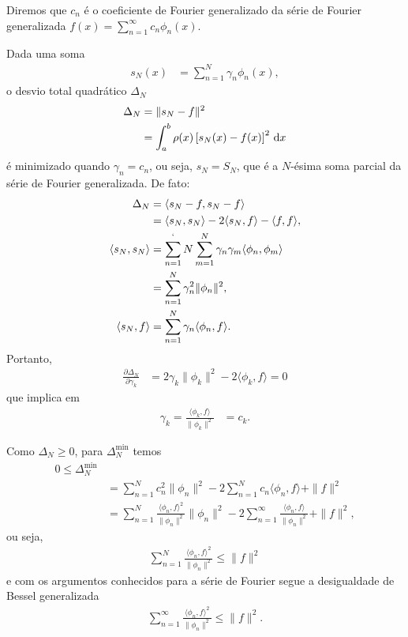 Diremos que $c_n$ é o coeficiente de Fourier generalizado da série de Fourier generalizada $f(x) = \sum_{n = 1}^\infty c_n \phi_n(x)$.

Dada uma soma
\begin{align*}
    s_N(x) &= \sum_{n = 1}^N \gamma_n \phi_n(x),
\end{align*}
o desvio total quadrático $\Delta_N$
\begin{align*}
    \Delta_N &= \| s_N - f \|^2 \\
    &= \int_a^b \rho(x) \left[ s_N(x) - f(x) \right]^2 \, \mathrm{d}x
\end{align*}
é minimizado quando $\gamma_n = c_n$, ou seja, $s_N = S_N$, que é a $N$-ésima soma parcial da série de Fourier generalizada. De fato:
\begin{align*}
    \Delta_N &= \langle s_N - f, s_N - f \rangle \\
    &= \langle s_N, s_N \rangle - 2 \langle s_N, f \rangle - \langle f, f \rangle, \\
    \langle s_N, s_N \rangle &= \sum_{n = 1}^`N \sum_{m = 1}^N \gamma_n \gamma_m \langle \phi_n, \phi_m \rangle \\
    &= \sum_{n = 1}^N \gamma_n^2 \| \phi_n \|^2, \\
    \langle s_N, f \rangle &= \sum_{n = 1}^N \gamma_n \langle \phi_n, f \rangle.
\end{align*}
Portanto,
\begin{align*}
    \frac{\partial \Delta_N}{\partial \gamma_k} &= 2 \gamma_k \| \phi_k \|^2 - 2 \langle \phi_k, f \rangle = 0
\end{align*}
que implica em
\begin{align*}
    \gamma_k = \frac{\langle \phi_k, f \rangle}{\| \phi_k \|^2} &= c_k.
\end{align*}

Como $\Delta_N \geq 0$, para $\Delta_N^{\min{}}$ temos
\begin{align*}
    0 \leq \Delta_N^{\min{}} \\
    &= \sum_{n = 1}^N c_n^2 \| \phi_n \|^2 - 2 \sum_{n = 1}^N c_n \langle \phi_n, f \rangle + \| f \|^2 \\
    &= \sum_{n = 1}^N \frac{\langle \phi_n, f \rangle^2}{\| \phi_n \|^2} \| \phi_n \|^2 - 2 \sum_{n = 1}^\infty \frac{\langle \phi_n, f \rangle}{\| \phi_n \|^2} + \| f \|^2,
\end{align*}
ou seja,
\begin{align*}
    \sum_{n = 1}^N \frac{\langle \phi_n, f \rangle^2}{\| \phi_n \|^2} \leq \| f \|^2
\end{align*}
e com os argumentos conhecidos para a série de Fourier segue a desigualdade de Bessel generalizada
\begin{align*}
    \sum_{n = 1}^\infty \frac{\langle \phi_n, f \rangle^2}{\| \phi_n \|^2} \leq \| f \|^2.
\end{align*}

